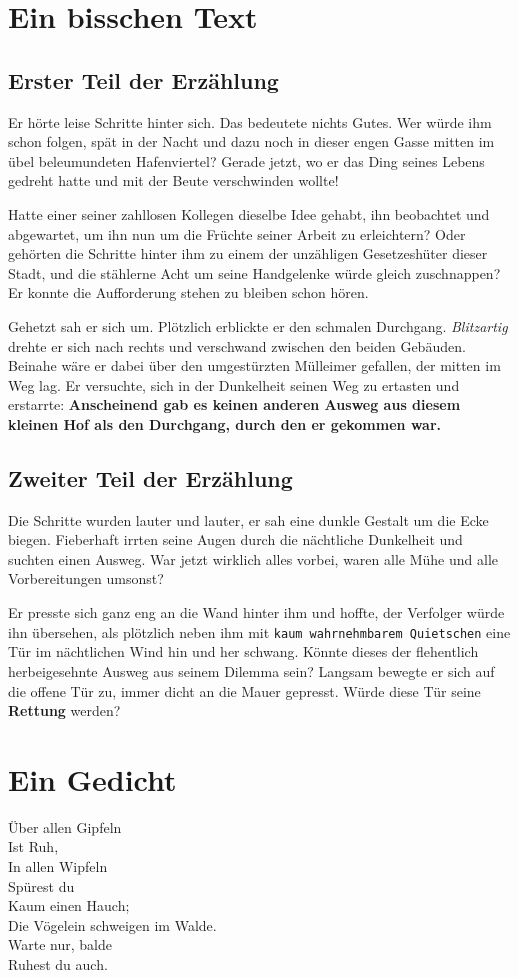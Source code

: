 \documentclass[a4paper]{article}
\begin{document}
\section{Ein bisschen Text}
\subsection{Erster Teil der Erzählung}
Er hörte leise Schritte hinter sich. Das bedeutete nichts Gutes. Wer würde ihm schon folgen, spät in der Nacht und dazu noch in dieser engen Gasse mitten im übel beleumundeten Hafenviertel? Gerade jetzt, wo er das Ding seines Lebens gedreht hatte und mit der Beute verschwinden wollte!

Hatte einer seiner zahllosen Kollegen dieselbe Idee gehabt, ihn beobachtet und abgewartet, um ihn nun um die Früchte seiner Arbeit zu erleichtern? Oder gehörten die Schritte hinter ihm zu einem der unzähligen Gesetzeshüter dieser Stadt, und die stählerne Acht um seine Handgelenke würde gleich zuschnappen? Er konnte die Aufforderung stehen zu bleiben schon hören.

Gehetzt sah er sich um. Plötzlich erblickte er den schmalen Durchgang. \emph{Blitzartig} drehte er sich nach rechts und verschwand zwischen den beiden Gebäuden. Beinahe wäre er dabei über den umgestürzten Mülleimer gefallen, der mitten im Weg lag. Er versuchte, sich in der Dunkelheit seinen Weg zu ertasten und erstarrte: \textbf{Anscheinend gab es keinen anderen Ausweg aus diesem kleinen Hof als den Durchgang, durch den er gekommen war.}

\subsection{Zweiter Teil der Erzählung}
Die Schritte wurden lauter und lauter, er sah eine dunkle Gestalt um die Ecke biegen. Fieberhaft irrten seine Augen durch die nächtliche Dunkelheit und suchten einen Ausweg. War jetzt wirklich alles vorbei, waren alle Mühe und alle Vorbereitungen umsonst?

Er presste sich ganz eng an die Wand hinter ihm und hoffte, der Verfolger würde ihn übersehen, als plötzlich neben ihm mit \texttt{kaum wahrnehmbarem Quietschen} eine Tür im nächtlichen Wind hin und her schwang. Könnte dieses der flehentlich herbeigesehnte Ausweg aus seinem Dilemma sein? Langsam bewegte er sich auf die offene Tür zu, immer dicht an die Mauer gepresst. Würde diese Tür seine \textbf{Rettung} werden?

\section{Ein Gedicht}
Über allen Gipfeln\\
Ist Ruh,\\
In allen Wipfeln\\
Spürest du\\
Kaum einen Hauch;\\
Die Vögelein schweigen im Walde.\\
Warte nur, balde\\
Ruhest du auch.
\end{document}
